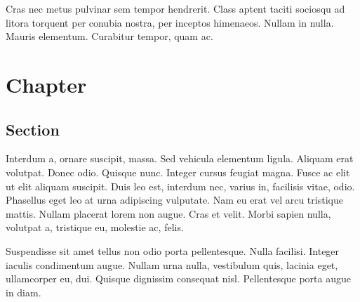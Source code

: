 \documentclass[a4paper]{report}
\begin{document}
Cras nec metus pulvinar sem tempor hendrerit. Class aptent taciti sociosqu ad
litora torquent per conubia nostra, per inceptos himenaeos. Nullam in nulla.
Mauris elementum. Curabitur tempor, quam ac.



%
%

\appendix 

\chapter{Chapter}

\section{Section}

%

Interdum a, ornare suscipit, massa. Sed vehicula elementum ligula. Aliquam erat
volutpat. Donec odio. Quisque nunc. Integer cursus feugiat magna. Fusce ac elit
ut elit aliquam suscipit. Duis leo est, interdum nec, varius in, facilisis
vitae, odio. Phasellus eget leo at urna adipiscing vulputate. Nam eu erat vel
arcu tristique mattis. Nullam placerat lorem non augue. Cras et velit. Morbi
sapien nulla, volutpat a, tristique eu, molestie ac, felis.

Suspendisse sit amet tellus non odio porta pellentesque. Nulla facilisi. Integer
iaculis condimentum augue. Nullam urna nulla, vestibulum quis, lacinia eget,
ullamcorper eu, dui. Quisque dignissim consequat nisl. Pellentesque porta augue
in diam. 
\end{document}
